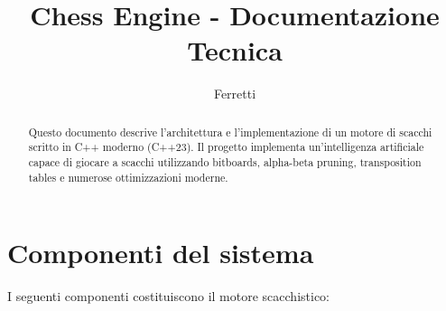 \documentclass{article}
\title{Chess Engine - Documentazione Tecnica}
\author{Ferretti}
\date{}
\begin{document}
\maketitle

\begin{abstract}
Questo documento descrive l'architettura e l'implementazione di un motore di scacchi
scritto in C++ moderno (C++23). Il progetto implementa un'intelligenza artificiale
capace di giocare a scacchi utilizzando bitboards, alpha-beta pruning, transposition
tables e numerose ottimizzazioni moderne.
\end{abstract}

\tableofcontents
\newpage




\section{Componenti del sistema}
I seguenti componenti costituiscono il motore scacchistico:










\end{document}
